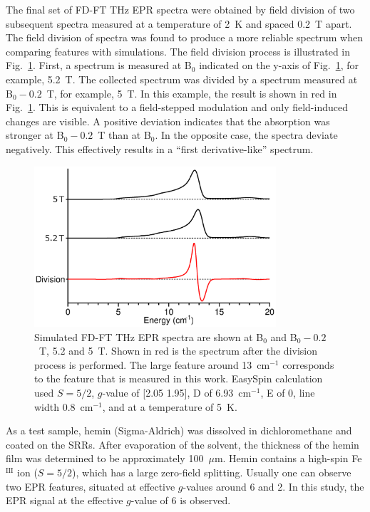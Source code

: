 The final set of FD-FT THz EPR spectra were obtained by field division of two subsequent spectra measured at a temperature of 2~K and spaced 0.2~T apart. The field division of spectra was found to produce a more reliable spectrum when comparing features with simulations. \cite{Schnegg09,Nehrkorn13,NEHRKORN201710} The field division process is illustrated in Fig.~\ref{ch4-fig:FDS}. First, a spectrum is measured at B$_0$ indicated on the y-axis of Fig.~\ref{ch4-fig:FDS}, for example, 5.2~T. The collected spectrum was divided by a spectrum measured at B$_0 - 0.2$~T, for example, 5~T. In this example, the result is shown in red in Fig.~\ref{ch4-fig:FDS}. This is equivalent to a field-stepped modulation and only field-induced changes are visible. A positive deviation indicates that the absorption was stronger at B$_0 - 0.2$~T than at B$_0$. In the opposite case, the spectra deviate negatively. This effectively results in a ``first derivative-like'' spectrum.

\begin{figure}[htp]
\centering
  \includegraphics[width=0.8\textwidth]{Kapitel/Ch4-Images/Ch4-ExperimentExplain.eps}
  \caption[FD-FT THz EPR field division of spectra]{Simulated FD-FT THz EPR spectra are shown at B$_0$ and B$_0 - 0.2$~T, 5.2 and 5~T. Shown in red is the spectrum after the division process is performed. The large feature around 13~cm$^{-1}$ corresponds to the feature that is measured in this work. EasySpin calculation used $S=5/2$, $g$-value of [2.05 1.95], D of 6.93~cm$^{-1}$, E of 0, line width 0.8~cm$^{-1}$, and at a temperature of 5~K.}
  \label{ch4-fig:FDS}
\end{figure}

As a test sample, hemin (Sigma-Aldrich) was dissolved in dichloromethane and coated on the SRRs. After evaporation of the solvent, the thickness of the hemin film was determined to be approximately 100~$\mu$m. Hemin contains a high-spin Fe$^\text{III}$ ion ($S = 5/2$), which has a large zero-field splitting. \cite{Nehrkorn15,Johnson66,Marathe73,Lang66} Usually one can observe two EPR features, situated at effective $g$-values around 6 and 2. \cite{Pilbrow90} In this study, the EPR signal at the effective $g$-value of 6 is observed. 

